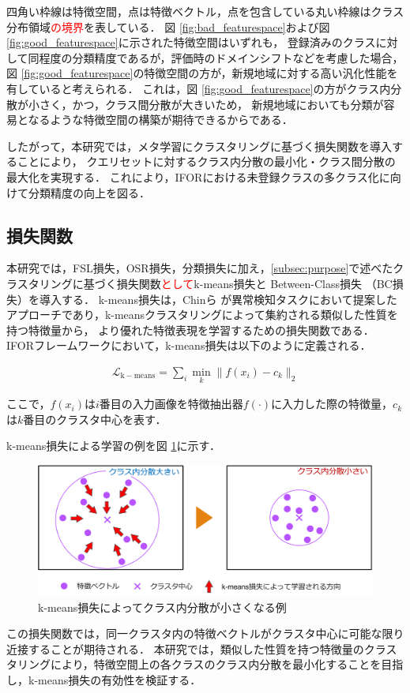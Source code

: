\documentclass[a4paper,11pt,nomag]{jsreport}
\begin{document}
% 
四角い枠線は特徴空間，点は特徴ベクトル，点を包含している丸い枠線はクラス分布領域\textcolor{red}{の境界}を表している．
図 \ref{fig:bad_featurespace}および図 \ref{fig:good_featurespace}に示された特徴空間はいずれも，
登録済みのクラスに対して同程度の分類精度であるが，評価時のドメインシフトなどを考慮した場合，
図 \ref{fig:good_featurespace}の特徴空間の方が，新規地域に対する高い汎化性能を有していると考えられる．
これは，図 \ref{fig:good_featurespace}の方がクラス内分散が小さく，かつ，クラス間分散が大きいため，
新規地域においても分類が容易となるような特徴空間の構築が期待できるからである．

したがって，本研究では，メタ学習にクラスタリングに基づく損失関数を導入することにより，
クエリセットに対するクラス内分散の最小化・クラス間分散の最大化を実現する．
これにより，IFORにおける未登録クラスの多クラス化に向けて分類精度の向上を図る．

\subsection{損失関数}

本研究では，FSL損失，OSR損失，分類損失に加え，\ref{subsec:purpose}で述べたクラスタリングに基づく損失関数\textcolor{red}{として}k-means損失と Between-Class損失 （BC損失）を導入する．
k-means損失は，Chinら \cite{k-means}が異常検知タスクにおいて提案したアプローチであり，k-meansクラスタリングによって集約される類似した性質を持つ特徴量から，
より優れた特徴表現を学習するための損失関数である．
IFORフレームワークにおいて，k-means損失は以下のように定義される．

\begin{align}
\mathcal{L}_{\mathrm{k-means}} = \sum_i{\min_k \lVert f(x_i)-c_k \rVert_2}
\end{align}

\noindent
ここで，$f(x_i)$は$i$番目の入力画像を特徴抽出器$f(\cdot)$に入力した際の特徴量，$c_k$は$k$番目のクラスタ中心を表す．

k-means損失による学習の例を図 \ref{fig:kmeans_loss}に示す．
% 
\begin{figure}[tbp]
  \centering
  \includegraphics[width=\linewidth, keepaspectratio]{image/kmeans_loss.png}
  \caption{k-means損失によってクラス内分散が小さくなる例}
  \label{fig:kmeans_loss}
\end{figure}
% 
この損失関数では，同一クラスタ内の特徴ベクトルがクラスタ中心に可能な限り近接することが期待される．
本研究では，類似した性質を持つ特徴量のクラスタリングにより，特徴空間上の各クラスのクラス内分散を最小化することを目指し，k-means損失の有効性を検証する．
\end{document}
